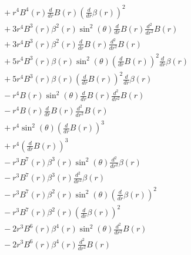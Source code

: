 \documentclass[11pt,a4paper]{article}
\begin{document}
\begin{align*}
  &\quad + r^{4} B^{4}{\left(r \right)} \frac{d}{d r} B{\left(r \right)} \left(\frac{d}{d r} \beta{\left(r \right)}\right)^{2} \\
  &\quad + 3 r^{4} B^{3}{\left(r \right)} \beta^{2}{\left(r \right)} \sin^{2}{\left(\theta \right)} \frac{d}{d r} B{\left(r \right)} \frac{d^{2}}{d r^{2}} B{\left(r \right)} \\
  &\quad + 3 r^{4} B^{3}{\left(r \right)} \beta^{2}{\left(r \right)} \frac{d}{d r} B{\left(r \right)} \frac{d^{2}}{d r^{2}} B{\left(r \right)} \\
  &\quad + 5 r^{4} B^{3}{\left(r \right)} \beta{\left(r \right)} \sin^{2}{\left(\theta \right)} \left(\frac{d}{d r} B{\left(r \right)}\right)^{2} \frac{d}{d r} \beta{\left(r \right)} \\
  &\quad + 5 r^{4} B^{3}{\left(r \right)} \beta{\left(r \right)} \left(\frac{d}{d r} B{\left(r \right)}\right)^{2} \frac{d}{d r} \beta{\left(r \right)} \\
  &\quad - r^{4} B{\left(r \right)} \sin^{2}{\left(\theta \right)} \frac{d}{d r} B{\left(r \right)} \frac{d^{2}}{d r^{2}} B{\left(r \right)} \\
  &\quad - r^{4} B{\left(r \right)} \frac{d}{d r} B{\left(r \right)} \frac{d^{2}}{d r^{2}} B{\left(r \right)} \\
  &\quad + r^{4} \sin^{2}{\left(\theta \right)} \left(\frac{d}{d r} B{\left(r \right)}\right)^{3} \\
  &\quad + r^{4} \left(\frac{d}{d r} B{\left(r \right)}\right)^{3} \\
  &\quad - r^{3} B^{7}{\left(r \right)} \beta^{3}{\left(r \right)} \sin^{2}{\left(\theta \right)} \frac{d^{2}}{d r^{2}} \beta{\left(r \right)} \\
  &\quad - r^{3} B^{7}{\left(r \right)} \beta^{3}{\left(r \right)} \frac{d^{2}}{d r^{2}} \beta{\left(r \right)} \\
  &\quad - r^{3} B^{7}{\left(r \right)} \beta^{2}{\left(r \right)} \sin^{2}{\left(\theta \right)} \left(\frac{d}{d r} \beta{\left(r \right)}\right)^{2} \\
  &\quad - r^{3} B^{7}{\left(r \right)} \beta^{2}{\left(r \right)} \left(\frac{d}{d r} \beta{\left(r \right)}\right)^{2} \\
  &\quad - 2 r^{3} B^{6}{\left(r \right)} \beta^{4}{\left(r \right)} \sin^{2}{\left(\theta \right)} \frac{d^{2}}{d r^{2}} B{\left(r \right)} \\
  &\quad - 2 r^{3} B^{6}{\left(r \right)} \beta^{4}{\left(r \right)} \frac{d^{2}}{d r^{2}} B{\left(r \right)} \\

\end{align*}
\end{document}
